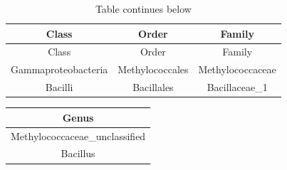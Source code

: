 \documentclass[]{article}
\begin{document}
\begin{longtable}[]{@{}ccc@{}}
\caption{Table continues below}\tabularnewline
\toprule
\begin{minipage}[b]{0.28\columnwidth}\centering\strut
Class\strut
\end{minipage} & \begin{minipage}[b]{0.23\columnwidth}\centering\strut
Order\strut
\end{minipage} & \begin{minipage}[b]{0.23\columnwidth}\centering\strut
Family\strut
\end{minipage}\tabularnewline
\midrule
\endfirsthead
\toprule
\begin{minipage}[b]{0.28\columnwidth}\centering\strut
Class\strut
\end{minipage} & \begin{minipage}[b]{0.23\columnwidth}\centering\strut
Order\strut
\end{minipage} & \begin{minipage}[b]{0.23\columnwidth}\centering\strut
Family\strut
\end{minipage}\tabularnewline
\midrule
\endhead
\begin{minipage}[t]{0.28\columnwidth}\centering\strut
Gammaproteobacteria\strut
\end{minipage} & \begin{minipage}[t]{0.23\columnwidth}\centering\strut
Methylococcales\strut
\end{minipage} & \begin{minipage}[t]{0.23\columnwidth}\centering\strut
Methylococcaceae\strut
\end{minipage}\tabularnewline
\begin{minipage}[t]{0.28\columnwidth}\centering\strut
Bacilli\strut
\end{minipage} & \begin{minipage}[t]{0.23\columnwidth}\centering\strut
Bacillales\strut
\end{minipage} & \begin{minipage}[t]{0.23\columnwidth}\centering\strut
Bacillaceae\_1\strut
\end{minipage}\tabularnewline
\bottomrule
\end{longtable}

\begin{longtable}[]{@{}c@{}}
\toprule
\begin{minipage}[b]{0.42\columnwidth}\centering\strut
Genus\strut
\end{minipage}\tabularnewline
\midrule
\endhead
\begin{minipage}[t]{0.42\columnwidth}\centering\strut
Methylococcaceae\_unclassified\strut
\end{minipage}\tabularnewline
\begin{minipage}[t]{0.42\columnwidth}\centering\strut
Bacillus\strut
\end{minipage}\tabularnewline
\bottomrule
\end{longtable}
\end{document}
